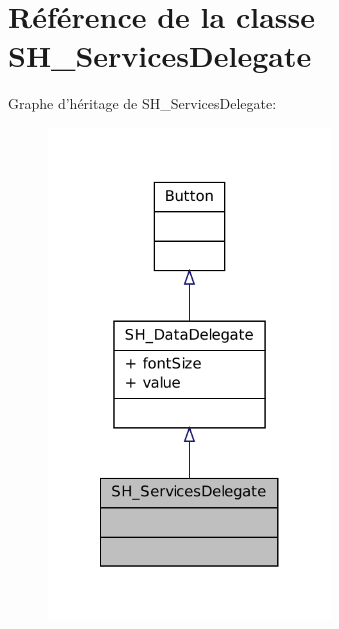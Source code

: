 \hypertarget{classSH__ServicesDelegate}{\section{Référence de la classe S\-H\-\_\-\-Services\-Delegate}
\label{classSH__ServicesDelegate}
}


Graphe d'héritage de S\-H\-\_\-\-Services\-Delegate\-:\nopagebreak
\begin{figure}[H]
\begin{center}
\leavevmode
\includegraphics[width=212pt]{classSH__ServicesDelegate__inherit__graph}
\end{center}
\end{figure}


